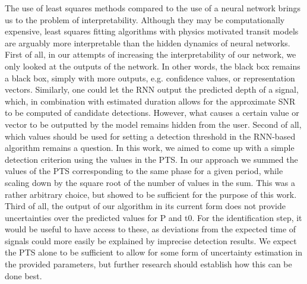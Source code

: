 The use of least squares methods compared to the use of a neural network brings us to the problem of interpretability. Although they may be computationally expensive, least squares fitting algorithms with physics motivated transit models are arguably more interpretable than the hidden dynamics of neural networks. First of all, in our attempts of increasing the interpretability of our network, we only looked at the outputs of the network. In other words, the black box remains a black box, simply with more outputs, e.g. confidence values, or representation vectors. Similarly, one could let the RNN output the predicted depth of a signal, which, in combination with estimated duration allows for the approximate SNR to be computed of candidate detections. However, what causes a certain value or vector to be outputted by the model remains hidden from the user. Second of all, which values should be used for setting a detection threshold in the RNN-based algorithm remains a question. In this work, we aimed to come up with a simple detection criterion using the values in the PTS. In our approach we summed the values of the PTS corresponding to the same phase for a given period, while scaling down by the square root of the number of values in the sum. This was a rather arbitrary choice, but showed to be sufficient for the purpose of this work.  Third of all, the output of our algorithm in its current form does not provide uncertainties over the predicted values for P and t0. For the identification step, it would be useful to have access to these, as deviations from the expected time of signals could more easily be explained by imprecise detection results. We expect the PTS alone to be sufficient to allow for some form of uncertainty estimation in the provided parameters, but further research should establish how this can be done best.